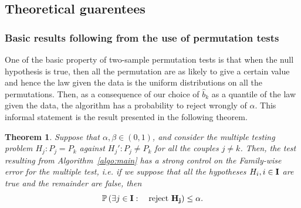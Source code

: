 \documentclass{article}
\theoremstyle{plain}
\newtheorem{Theorem}{Theorem}
\theoremstyle{remark}
\renewcommand{\P}{\mathbb{P}}
\newcommand{\1}{\mathbbm{1}}
\newcommand{\todoT}[1]{\todo[inline,color=blue!40]{{\textbf{T:}~}#1}}
\numberwithin{equation}{section}
\begin{document}
\newpage

\subsection{Theoretical guarentees}
\subsubsection{Basic results following from the use of permutation tests}
One of the basic property of two-sample permutation tests is that when the null hypothesis is true, then all the permutation are as likely to give a certain value and hence the law given the data is the uniform distributions on all the permutations. Then, as a consequence of our choice of $\widehat{b}_k$ as a quantile of the law given the data, the algorithm has a probability to reject wrongly of $\alpha$. This informal statement is the result presented in the following theorem.


\begin{Theorem}\label{th:multi_FWE}
Suppose that $\alpha,\beta \in  (0,1)$, and consider the multiple testing problem $H_j: P_j = P_k$ against $H_j': P_j \neq P_k$ for all the couples $j \neq k$. 
Then, the test resulting from Algorithm~\ref{algo:main} has a strong control on the Family-wise error for the multiple test, i.e. if we suppose that all the hypotheses $H_i, i\in \bf I$ are true and the remainder are false, then 
$$ \P\left(\exists j \in \bf{I}:\quad  \text{reject }H_j\right)\le\alpha.$$
\end{Theorem}
\end{document}
